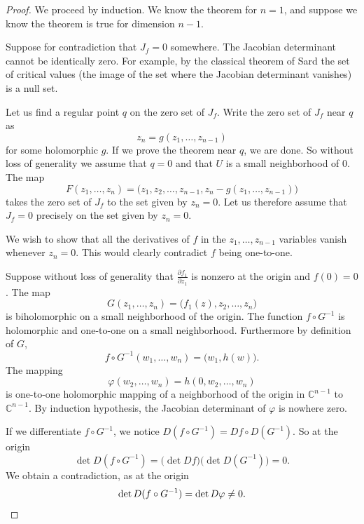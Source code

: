 \documentclass[12pt,openany]{book}
\newcommand{\C}{{\mathbb{C}}}
\theoremstyle{plain}
\theoremstyle{remark}
\theoremstyle{definition}
\theoremstyle{exercise}
\theoremstyle{example}
\begin{document}
\begin{proof}
We proceed by induction.  We know the theorem for $n=1$,
and suppose we know the theorem is true for dimension $n-1$.

Suppose for contradiction that $J_f = 0$ somewhere.
The Jacobian determinant cannot be identically zero.  For example, by the
classical theorem of Sard the set of critical values (the image of the set
where the Jacobian determinant vanishes) is a null set.

Let us find a regular point $q$ on the zero set of $J_f$.
Write the zero set of $J_f$ near $q$ as
\begin{equation*}
z_n = g(z_1,\ldots,z_{n-1})
\end{equation*}
for some holomorphic $g$.
If we prove the theorem near $q$, we are done.  So without loss of generality
we assume that $q=0$ and that $U$ is a
small neighborhood of $0$.  The map
\begin{equation*}
F(z_1,\ldots,z_n) = \bigl(z_1,z_2,\ldots,z_{n-1},z_n-g(z_1,\ldots,z_{n-1}) \bigr)
\end{equation*}
takes the zero set of $J_f$ to the set given by $z_n=0$.  Let us therefore assume
that $J_f = 0$ precisely on the set given by $z_n=0$.

We wish to show that all the derivatives of $f$ in the $z_1,\ldots,z_{n-1}$
variables vanish whenever $z_n = 0$.  This
would clearly contradict $f$ being one-to-one.

Suppose without loss of generality that $\frac{\partial f_1}{\partial z_1}$
is nonzero at the origin and $f(0) = 0$.
The map
\begin{equation*}
G(z_1,\ldots,z_n) = \bigl(f_1(z),z_2,\ldots,z_n\bigr)
\end{equation*}
is biholomorphic on a small neighborhood of the origin.
The function $f \circ G^{-1}$ is holomorphic and one-to-one on a small
neighborhood.  Furthermore by definition of $G$,
\begin{equation*}
f \circ G^{-1} (w_1,\ldots,w_n) = \bigl(w_1,h(w)\bigr) .
\end{equation*}
The mapping
\begin{equation*}
\varphi(w_2,\ldots,w_n) = h(0,w_2,\ldots,w_n)
\end{equation*}
is one-to-one holomorphic mapping of a neighborhood of the origin in
$\C^{n-1}$ to $\C^{n-1}$.  By induction hypothesis, the Jacobian determinant of
$\varphi$ is nowhere zero.

If we differentiate $f \circ G^{-1}$, we notice 
$D(f \circ G^{-1}) = Df \circ D(G^{-1})$.
So at the origin
\begin{equation*}
\det D(f \circ G^{-1}) = \bigl(\det Df\bigr) \bigl(\det D(G^{-1})\bigr) = 0.
\end{equation*}
We obtain a contradiction, as at the origin
\begin{equation*}
\det 
D(f \circ G^{-1})
= \det D\varphi \not= 0 . \qedhere
\end{equation*}
\end{proof}
\end{document}

